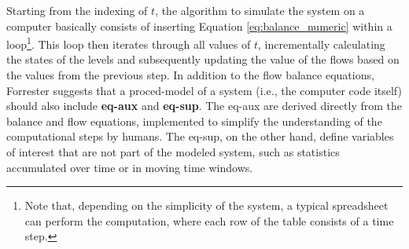 \documentclass[./main_en.tex]{subfiles}
\begin{document}
\par Starting from the indexing of $t$, the algorithm to simulate the \gls{system} on a computer basically consists of inserting Equation \eqref{eq:balance_numeric} within a loop\footnote{Note that, depending on the simplicity of the \gls{system}, a typical spreadsheet can perform the computation, where each row of the table consists of a time step.}. This loop then iterates through all values of $t$, incrementally calculating the states of the levels and subsequently updating the value of the flows based on the values from the previous step. In addition to the flow balance equations, Forrester suggests that a \gls{proced-model} of a \gls{system} (i.e., the computer code itself) should also include \textbf{\gls{eq-aux}} and \textbf{\gls{eq-sup}}. The \gls{eq-aux} are derived directly from the balance and flow equations, implemented to simplify the understanding of the computational steps by humans. The \gls{eq-sup}, on the other hand, define variables of interest that are not part of the modeled \gls{system}, such as statistics accumulated over time or in moving time windows.
\end{document}
